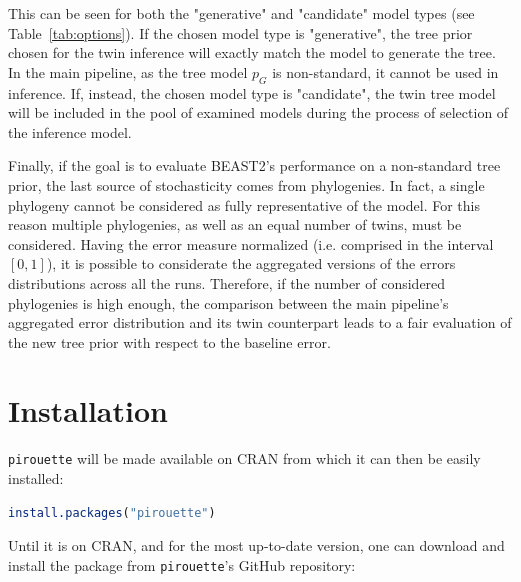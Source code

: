 This can be seen for both the "generative" and "candidate" model 
types (see Table~\ref{tab:options}).
If the chosen model type is "generative", 
the tree prior chosen for the twin inference will  
exactly match the model to generate the tree.
In the main pipeline, as the tree model $p_{G}$ is non-standard, 
it cannot be used in inference.
If, instead, the chosen model type is "candidate", 
the twin tree model will be included in the pool of examined models 
during the process of selection of the inference model. 

Finally, if the goal is to evaluate BEAST2's performance on a non-standard tree prior, 
the last source of stochasticity comes from phylogenies. 
In fact, a single phylogeny cannot be considered 
as fully representative of the model. 
For this reason multiple phylogenies, 
as well as an equal number of twins, 
must be considered. 
Having the error measure normalized (i.e. comprised in the interval $[0, 1]$), 
it is possible to considerate the aggregated versions of the errors distributions 
across all the runs.
Therefore, if the number of considered phylogenies is high enough, 
the comparison between the main pipeline's aggregated error distribution 
and its twin counterpart leads to a fair evaluation 
of the new tree prior with respect to the baseline error.

\section{Installation}

\verb;pirouette; will be made available on CRAN from which 
it can then be easily installed:
\begin{lstlisting}[language=R, floatplacement=ht, frame=single]
install.packages("pirouette")
\end{lstlisting}

Until it is on CRAN, and for the most up-to-date version, 
one can download and install the package from \verb;pirouette;'s GitHub 
repository:

